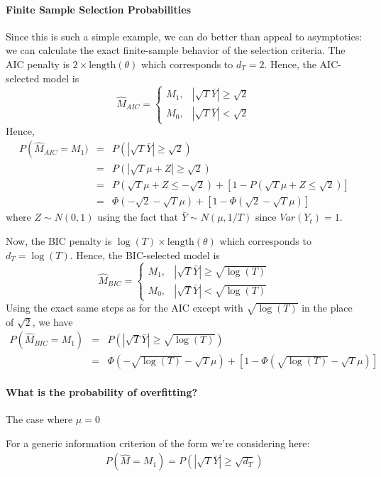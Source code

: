 \documentclass[12pt]{article}
\theoremstyle{definition}
\begin{document}
\paragraph{Finite Sample Selection Probabilities} Since this is such a simple example, we can do better than appeal to asymptotics: we can calculate the exact finite-sample behavior of the selection criteria. The AIC penalty is $2 \times \mbox{length}(\theta)$ which corresponds to $d_T = 2$. Hence, the AIC-selected model is
	$$\widehat{M}_{AIC} = \left\{\begin{array}
		{cc} M_1, &|\sqrt{T}\bar{Y}| \geq \sqrt{2} \\
		M_0, & |\sqrt{T} \bar{Y}| < \sqrt{2}
	\end{array} \right.$$
Hence,
	\begin{eqnarray*}
		P\left(\widehat{M}_{AIC} = M_1) &=& P\left(\left|\sqrt{T}\bar{Y} \right| \geq \sqrt{2}  \right)\\
		&=& P\left(\left|\sqrt{T}\mu + Z\right| \geq \sqrt{2}  \right)\\
		&=& P\left(\sqrt{T}\mu + Z \leq -\sqrt{2}\right) + \left[1 - P\left(\sqrt{T} \mu +Z \leq \sqrt{2}\right) \right]\\
			&=& \Phi\left(-\sqrt{2} - \sqrt{T}\mu\right) + \left[1 -  \Phi\left(\sqrt{2} - \sqrt{T} \mu \right)\right]
	\end{eqnarray*}
where $Z \sim N(0,1)$ using the fact that $\bar{Y} \sim N(\mu, 1/T)$ since $Var(Y_t)=1$.

Now, the BIC penalty is $\log(T)\times \mbox{length}(\theta)$ which corresponds to $d_T = \log(T)$. Hence, the BIC-selected model is
	$$\widehat{M}_{BIC} = \left\{\begin{array}
		{cc} M_1, & |\sqrt{T}\bar{Y} | \geq \sqrt{\log(T)} \\
		M_0, & |\sqrt{T} \bar{Y}| < \sqrt{\log(T)}
	\end{array} \right.$$
Using the exact same steps as for the AIC except with $\sqrt{\log(T)}$ in the place of $\sqrt{2}$, we have
	\begin{eqnarray*}
		P\left(\widehat{M}_{BIC} = M_1\right) &=& P\left(\left|\sqrt{T}\bar{Y} \right| \geq \sqrt{\log(T)}  \right)\\
			&=& \Phi\left(-\sqrt{\log(T)} - \sqrt{T}\mu\right) + \left[1 -  \Phi\left(\sqrt{\log(T)} - \sqrt{T} \mu \right)\right]
	\end{eqnarray*}


\paragraph{What is the probability of overfitting?} The case where $\mu = 0$

For a generic information criterion of the form we're considering here:
\begin{eqnarray*}
	P\left(\widehat{M} = M_1\right) = P\left(|\sqrt{T}\bar{Y}|\geq \sqrt{d_T}\right)
\end{eqnarray*}
\end{document}
